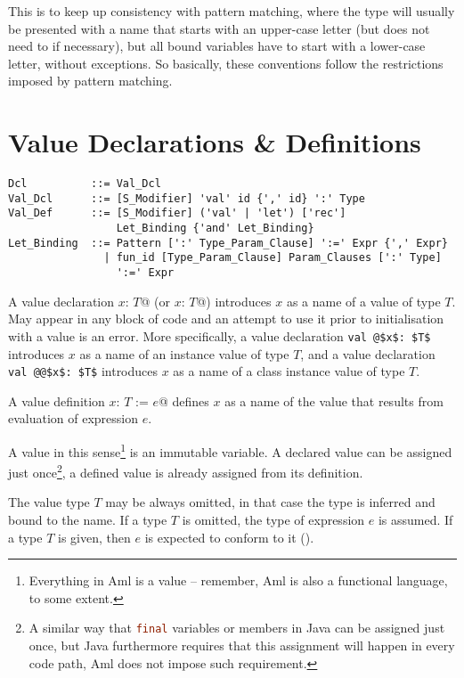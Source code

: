 This is to keep up consistency with pattern matching, where the type will usually be presented with a name that starts with an upper-case letter (but does not need to if necessary), but all bound variables have to start with a lower-case letter, without exceptions. So basically, these conventions follow the restrictions imposed by pattern matching. 





\section{Value Declarations \& Definitions}
\label{sec:value-dcl-def}

\grammar\begin{lstlisting}
Dcl          ::= Val_Dcl
Val_Dcl      ::= [S_Modifier] 'val' id {',' id} ':' Type
Val_Def      ::= [S_Modifier] ('val' | 'let') ['rec']
                 Let_Binding {'and' Let_Binding}
Let_Binding  ::= Pattern [':' Type_Param_Clause] ':=' Expr {',' Expr}
               | fun_id [Type_Param_Clause] Param_Clauses [':' Type]
                 ':=' Expr
\end{lstlisting}

A value declaration \lstinline@val $x$: $T$@ (or \lstinline@let $x$: $T$@) introduces $x$ as a name of a value of type $T$. May appear in any block of code and an attempt to use it prior to initialisation with a value is an error. More specifically, a value declaration \lstinline+val @$x$: $T$+ introduces $x$ as a name of an instance value of type $T$, and a value declaration \lstinline+val @@$x$: $T$+ introduces $x$ as a name of a class instance value of type $T$. 

A value definition \lstinline@val $x$: $T$ := $e$@ defines $x$ as a name of the value that results from evaluation of expression $e$.

A value in this sense\footnote{Everything in Aml is a value -- remember, Aml is also a functional language, to some extent.} is an immutable variable. A declared value can be assigned just once\footnote{A similar way that \lstinline[language=Java]@final@ variables or members in Java can be assigned just once, but Java furthermore requires that this assignment will happen in every code path, Aml does not impose such requirement.}, a defined value is already assigned from its definition. 

The value type $T$ may be always omitted, in that case the type is inferred and bound to the name. If a type $T$ is omitted, the type of expression $e$ is assumed. If a type $T$ is given, then $e$ is expected to conform to it (). 


